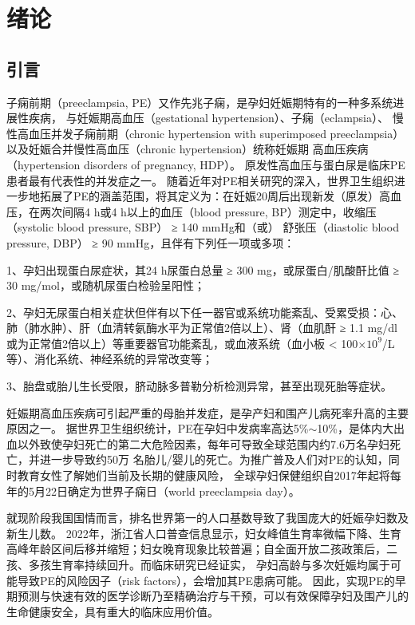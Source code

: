 \chapter{绪论}

\section{引言}
子痫前期（preeclampsia, PE）又作先兆子痫，是孕妇妊娠期特有的一种多系统进展性疾病， 与妊娠期高血压（gestational hypertension）、子痫（eclampsia）、
慢性高血压并发子痫前期（chronic hypertension with superimposed preeclampsia）以及妊娠合并慢性高血压（chronic hypertension）统称妊娠期
高血压疾病（hypertension disorders of pregnancy, HDP）\cite{OAG9,HDASOM,2000s1}。
原发性高血压与蛋白尿是临床PE患者最有代表性的并发症之一。
随着近年对PE相关研究的深入，世界卫生组织进一步地拓展了PE的涵盖范围，将其定义为：在妊娠20周后出现新发（原发）高血压，在两次间隔4 h或4 h以上的血压（blood pressure, BP）测定中，收缩压（systolic blood pressure, SBP） ≥ 140 mmHg和（或）
舒张压（diastolic blood pressure, DBP） ≥ 90 mmHg，且伴有下列任一项或多项\cite{OAG9,FIGO}：

1、孕妇出现蛋白尿症状，其24 h尿蛋白总量 ≥ 300 mg，或尿蛋白/肌酸酐比值 ≥ 30 mg/mol，或随机尿蛋白检验呈阳性；

2、孕妇无尿蛋白相关症状但伴有以下任一器官或系统功能紊乱、受累受损：心、肺（肺水肿）、肝（血清转氨酶水平为正常值2倍以上）、肾（血肌酐 ≥ 1.1 mg/dl
或为正常值2倍以上）等重要器官功能紊乱，或血液系统（血小板 < 100$\times 10^{9}$/L等）、消化系统、神经系统的异常改变等；

3、胎盘或胎儿生长受限，脐动脉多普勒分析检测异常，甚至出现死胎等症状。

妊娠期高血压疾病可引起严重的母胎并发症，是孕产妇和围产儿病死率升高的主要原因之一\cite{OAG9}。
据世界卫生组织统计，PE在孕妇中发病率高达5\%$ \sim $10\%，是体内大出血以外致使孕妇死亡的第二大危险因素，每年可导致全球范围内约7.6万名孕妇死亡，并进一步导致约50万
名胎儿/婴儿的死亡\cite{DAM2015,LCT2006}。为推广普及人们对PE的认知，同时教育女性了解她们当前及长期的健康风险，
全球孕妇保健组织自2017年起将每年的5月22日确定为世界子痫日（world preeclampsia day）。

就现阶段我国国情而言，排名世界第一的人口基数导致了我国庞大的妊娠孕妇数及新生儿数\cite{nbs2022}。
2022年，浙江省人口普查信息显示，妇女峰值生育率微幅下降、生育高峰年龄区间后移并缩短；妇女晚育现象比较普遍；自全面开放二孩政策后，二孩、多孩生育率持续回升\cite{zjtjj2022}。而临床研究已经证实，
孕妇高龄与多次妊娠均属于可能导致PE的风险因子（risk factors），会增加其PE患病可能\cite{Duckitt2005,FIGO,Yogev2010,Poon2010,Lee2000,Coonrod1995,Robillard1993}。
因此，实现PE的早期预测与快速有效的医学诊断乃至精确治疗与干预，可以有效保障孕妇及围产儿的生命健康安全，具有重大的临床应用价值。
